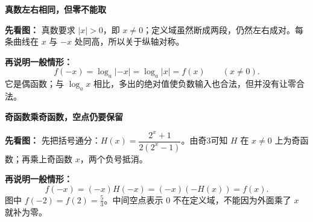 \clearpage
\begin{explanationbox}
\textbf{\textcolor{CExplanation}{真数左右相同，但零不能取}}

\textbf{先看图：} 真数要求 $|x|>0$，即 $x\ne0$；定义域虽然断成两段，仍然左右成对。每条曲线在 $x$ 与 $-x$ 处同高，所以关于纵轴对称。

\textbf{再说明一般情形：}
\[
f(-x)=\log_a|-x|=\log_a|x|=f(x)\qquad(x\ne0).
\]
它是偶函数；与 $\log_a x$ 相比，多出的绝对值使负数输入也合法，但并没有让零合法。
\end{explanationbox}
\clearpage
\begin{explanationbox}
\textbf{\textcolor{CExplanation}{奇函数乘奇函数，空点仍要保留}}

\textbf{先看图：} 先把括号通分：$H(x)=\dfrac{2^x+1}{2(2^x-1)}$。由奇3可知 $H$ 在 $x\ne0$ 上为奇函数；再乘上奇函数 $x$，两个负号抵消。

\textbf{再说明一般情形：}
\[
f(-x)=(-x)H(-x)=(-x)(-H(x))=f(x).
\]
图中 $f(-2)=f(2)=\frac53$。中间空点表示 $0$ 不在定义域，不能因为外面乘了 $x$ 就补为零。
\end{explanationbox}
